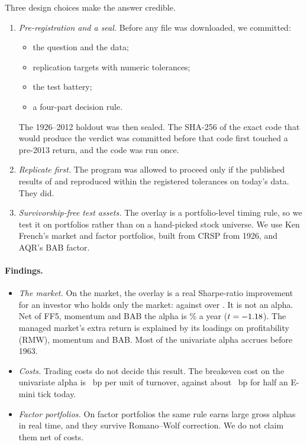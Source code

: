 \documentclass[11pt]{article}
\begin{document}
Three design choices make the answer credible.
\begin{enumerate}
\item \emph{Pre-registration and a seal.} Before any file was downloaded, we
  committed:
  \begin{itemize}
  \item the question and the data;
  \item replication targets with numeric tolerances;
  \item the test battery;
  \item a four-part decision rule.
  \end{itemize}
  The 1926--2012 holdout was then sealed. The SHA-256 of the exact code that
  would produce the verdict was committed before that code first touched a
  pre-2013 return, and the code was run once.
\item \emph{Replicate first.} The program was allowed to proceed only if the
  published results of \citet{moreira2017} and \citet{cederburg2020}
  reproduced within the registered tolerances on today's data. They did.
\item \emph{Survivorship-free test assets.} The overlay is a portfolio-level
  timing rule, so we test it on portfolios rather than on a hand-picked
  stock universe. We use Ken French's market and factor portfolios, built
  from CRSP from 1926, and AQR's BAB factor.
\end{enumerate}

\paragraph{Findings.}
\begin{itemize}
\item \emph{The market.} On the market, the overlay is a real Sharpe-ratio
  improvement for an investor who holds only the market: \mktSRm{} against
  \mktSRr{} over \mktUniSpan. It is not an alpha. Net of FF5, momentum and
  BAB the alpha is \mktFullA\% a year ($t=-1.18$). The managed market's
  extra return is explained by its loadings on profitability (RMW), momentum
  and BAB. Most of the univariate alpha accrues before 1963.
\item \emph{Costs.} Trading costs do not decide this result. The breakeven
  cost on the univariate alpha is \breakevenUni{}~bp per unit of turnover,
  against about \emHalfTickBp{}~bp for half an E-mini tick today.
\item \emph{Factor portfolios.} On factor portfolios the same rule earns
  large gross alphas in real time, and they survive Romano--Wolf
  correction. We do not claim them net of costs.
\end{itemize}
\end{document}
